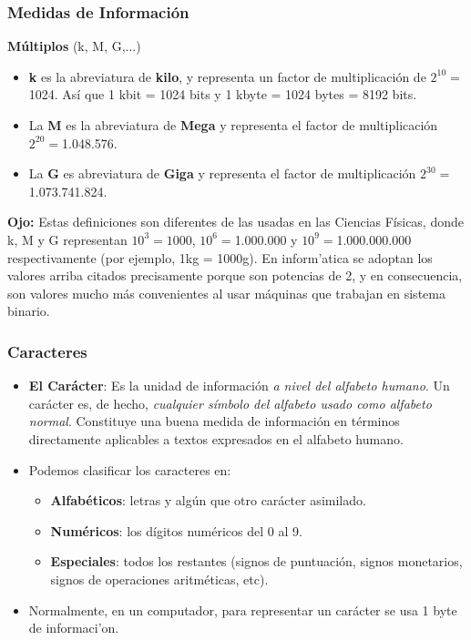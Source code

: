 \documentclass{beamer}
\begin{document}
\begin{frame}[fragile]\frametitle{Medidas de Información}
\textbf{Múltiplos} (k, M, G,...)
\begin{itemize}
	\item \textbf{k} es la abreviatura de \textbf{kilo}, y representa un factor de multiplicación de $2^{10}= $1024. Así que 1 kbit = 1024 bits y 1 kbyte = 1024 bytes = 8192 bits. 

	\item La \textbf{M} es la abreviatura de \textbf{Mega} y representa el factor de multiplicación $2^{20}= $1.048.576.
	\item La \textbf{G} es abreviatura de \textbf{Giga} y representa el factor de multiplicación $2^{30} = $1.073.741.824.
\end{itemize}
\textbf{Ojo:} Estas definiciones son diferentes de las usadas en las Ciencias Físicas, donde k, M y G representan $10^3=1000$, $10^6=$1.000.000 y $10^9=$1.000.000.000 respectivamente (por ejemplo, 1kg = 1000g). En inform'atica se adoptan los valores arriba citados precisamente porque son potencias de 2, y en consecuencia, son valores mucho más convenientes al usar máquinas que trabajan en sistema binario.
\end{frame}


\begin{frame}[fragile]\frametitle{Caracteres}
\begin{itemize}

\item \textbf{El Carácter}: Es la unidad de información \textit{a nivel del alfabeto humano}. Un carácter es, de hecho, \textit{cualquier símbolo del alfabeto usado como alfabeto normal}. Constituye una buena medida de información en términos directamente aplicables a textos expresados en el alfabeto humano.

\item Podemos clasificar los caracteres en:
	\begin{itemize}
		\item \textbf{Alfabéticos}: letras y algún que otro carácter asimilado.
		\item \textbf{Numéricos}: los dígitos numéricos del 0 al 9.
		\item \textbf{Especiales}: todos los restantes (signos de puntuación, signos monetarios, signos de operaciones aritméticas, etc).
	\end{itemize}
	\item Normalmente, en un computador, para representar un carácter se usa 1 byte de informaci'on.
\end{itemize}
\end{frame}
\end{document}
